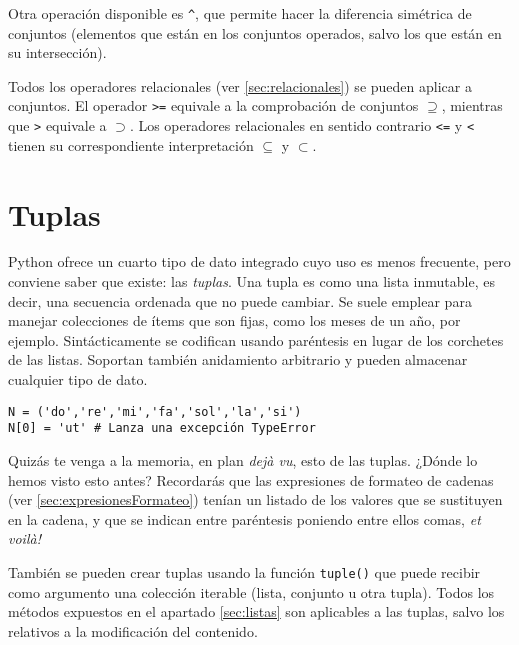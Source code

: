 Otra operación disponible es \texttt{\^{}}, que permite hacer la diferencia simétrica de conjuntos (elementos que están en los conjuntos operados, salvo los que están en su intersección). 

Todos los operadores relacionales (ver \ref{sec:relacionales}) se pueden aplicar a conjuntos. El operador \texttt{>=} equivale a la comprobación de conjuntos \texttt{$\supseteq$}, mientras que \texttt{>} equivale a \texttt{$\supset$}. Los operadores relacionales en sentido contrario \texttt{<=} y \texttt{<} tienen su correspondiente interpretación \texttt{$\subseteq$} y \texttt{$\subset$}.

\section{Tuplas}

Python ofrece un cuarto tipo de dato integrado cuyo uso es menos frecuente, pero conviene saber que existe: las \emph{tuplas}. Una tupla es como una lista inmutable, es decir, una secuencia ordenada que no puede cambiar. Se suele emplear para manejar colecciones de ítems que son fijas, como los meses de un año, por ejemplo. Sintácticamente se codifican usando paréntesis en lugar de los corchetes de las listas. Soportan también anidamiento arbitrario y pueden almacenar cualquier tipo de dato.

\begin{lstlisting}
N = ('do','re','mi','fa','sol','la','si')
N[0] = 'ut' # Lanza una excepción TypeError
\end{lstlisting}

Quizás te venga a la memoria, en plan \emph{dejà vu}, esto de las tuplas. ¿Dónde lo hemos visto esto antes? Recordarás que las expresiones de formateo de cadenas (ver \ref{sec:expresionesFormateo}) tenían un listado de los valores que se sustituyen en la cadena, y que se indican entre paréntesis poniendo entre ellos comas, \emph{et voilà!}

También se pueden crear tuplas usando la función \texttt{tuple()} que puede recibir como argumento una colección iterable (lista, conjunto u otra tupla). Todos los métodos expuestos en el apartado \ref{sec:listas} son aplicables a las tuplas, salvo los relativos a la modificación del contenido.